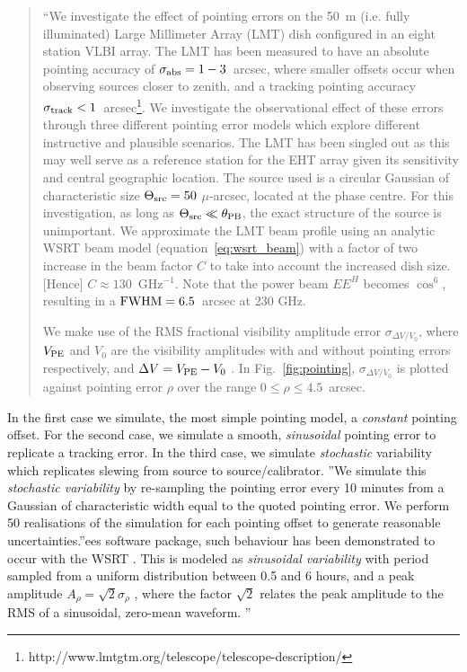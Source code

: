 \begin{quotation}
``We investigate the effect of pointing errors on the 50~m (i.e. fully illuminated) Large Millimeter Array (LMT) dish configured in an eight station VLBI array. The LMT has been measured to have an absolute pointing accuracy of $\sigma_{\rm abs} = 1-3$~arcsec, where smaller offsets occur when observing sources closer to zenith, and a tracking pointing accuracy $\sigma_{\rm track} < 1$~arcsec\footnote{http://www.lmtgtm.org/telescope/telescope-description/}. We investigate the observational effect of these errors through three different pointing error models which explore different instructive and plausible scenarios. The LMT has been singled out as this may well serve as a reference station for the EHT array given its sensitivity and central geographic location. The source used is a circular Gaussian of characteristic size $\Theta_{\rm src}=50$ $\mu$-arcsec, located at the phase centre. For this investigation, as long as $\Theta_{\rm src} \ll \theta_{\rm PB}$, the exact structure of the source is unimportant. We approximate the LMT beam profile using an analytic WSRT beam model (equation~\ref{eq:wsrt_beam}) with a factor of two increase in the beam factor $C$ to take into account the increased dish size. [Hence] $C \approx 130$~GHz$^{-1}$. Note that the power beam $EE^H$ becomes $\cos^6$, resulting in a $\rm{FWHM} = 6.5 $~arcsec at 230 GHz.


We make use of the RMS fractional visibility amplitude error $\sigma_{\Delta V/V_0}$, where $V_{\rm PE}$ and $V_{0}$ are the visibility amplitudes with and without pointing errors respectively, and  $\Delta V = V_{\rm PE} - V_{0}$ . In Fig.~\ref{fig:pointing}, $\sigma_{\Delta V/V_0}$ is plotted against pointing error $\rho$ over the range $0 \le \rho \le 4.5$~arcsec.
\\
\citep{Blecher_2016}
\end{quotation}

In the first case we simulate, the most simple pointing model, a \emph{constant} pointing offset. For the second case, we simulate a smooth, \emph{sinusoidal} pointing error to replicate a tracking error. In the third case, we simulate \emph{stochastic} variability which replicates slewing from source to source/calibrator.  ''We simulate this \emph{stochastic variability} by re-sampling the pointing error every 10 minutes from a Gaussian of characteristic width equal to the quoted pointing error. We perform 50 realisations of the simulation for each pointing offset to generate reasonable uncertainties.''ees software package, such behaviour has been demonstrated to occur with the WSRT \citep{Smirnov_Calim_2011,Smirnov_2011c}. This is modeled as \emph{sinusoidal variability} with period sampled from a uniform distribution between 0.5 and 6 hours, and a peak amplitude $A_{\rho} = \sqrt{2} \sigma_{\rho}$ , where the factor $\sqrt{2}$ relates the peak amplitude to the RMS of a sinusoidal, zero-mean waveform. ''


